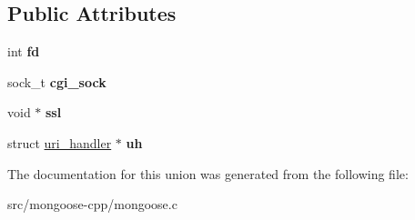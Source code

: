 \subsection*{Public Attributes}
\begin{DoxyCompactItemize}
\item 
int {\bfseries fd}\hypertarget{unionendpoint_a8833c99eb9ccdf1c870d783e52a999de}{}\label{unionendpoint_a8833c99eb9ccdf1c870d783e52a999de}

\item 
sock\+\_\+t {\bfseries cgi\+\_\+sock}\hypertarget{unionendpoint_ab5cde7581e12d19a8db7b946c8c343ab}{}\label{unionendpoint_ab5cde7581e12d19a8db7b946c8c343ab}

\item 
void $\ast$ {\bfseries ssl}\hypertarget{unionendpoint_ae328b21cb981eb03c3828d86c0966459}{}\label{unionendpoint_ae328b21cb981eb03c3828d86c0966459}

\item 
struct \hyperlink{structuri__handler}{uri\+\_\+handler} $\ast$ {\bfseries uh}\hypertarget{unionendpoint_aa68bca0d6e2a08f809c73e1879383e89}{}\label{unionendpoint_aa68bca0d6e2a08f809c73e1879383e89}

\end{DoxyCompactItemize}


The documentation for this union was generated from the following file\+:\begin{DoxyCompactItemize}
\item 
src/mongoose-\/cpp/mongoose.\+c\end{DoxyCompactItemize}
